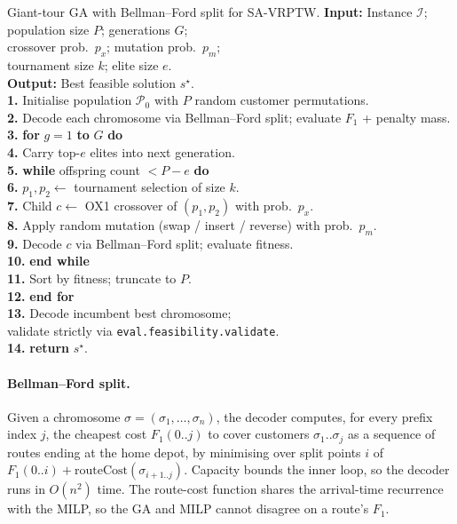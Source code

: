 \begin{pseudocode}{Giant-tour GA with Bellman--Ford split for SA-VRPTW.}
\label{alg:ga}
\textbf{Input:} \> Instance $\mathcal{I}$; population size $P$;
generations $G$; \\
\>\> crossover prob.\ $p_x$; mutation prob.\ $p_m$; \\
\>\> tournament size $k$; elite size $e$. \\
\textbf{Output:}\> Best feasible solution $s^\star$. \\[2pt]
\textbf{1.}\> Initialise population $\mathcal{P}_0$ with $P$ random
customer permutations. \\
\textbf{2.}\> Decode each chromosome via Bellman--Ford split; evaluate $F_1$ + penalty mass. \\
\textbf{3.}\> \textbf{for} $g = 1$ \textbf{to} $G$ \textbf{do} \\
\textbf{4.}\>\> Carry top-$e$ elites into next generation. \\
\textbf{5.}\>\> \textbf{while} offspring count $< P - e$ \textbf{do} \\
\textbf{6.}\>\>\> $p_1, p_2 \gets$ tournament selection of size $k$. \\
\textbf{7.}\>\>\> Child $c \gets$ OX1 crossover of $(p_1, p_2)$ with prob.\ $p_x$. \\
\textbf{8.}\>\>\> Apply random mutation (swap / insert / reverse) with prob.\ $p_m$. \\
\textbf{9.}\>\>\> Decode $c$ via Bellman--Ford split; evaluate fitness. \\
\textbf{10.}\>\> \textbf{end while} \\
\textbf{11.}\>\> Sort by fitness; truncate to $P$. \\
\textbf{12.}\> \textbf{end for} \\
\textbf{13.}\> Decode incumbent best chromosome; \\
\>\> validate strictly via \texttt{eval.feasibility.validate}. \\
\textbf{14.}\> \textbf{return} $s^\star$.
\end{pseudocode}

\paragraph{Bellman--Ford split.}
Given a chromosome $\sigma = (\sigma_1, \dots, \sigma_n)$, the
decoder computes, for every prefix index $j$, the cheapest cost
$F_1(0..j)$ to cover customers $\sigma_1..\sigma_j$ as a sequence of
routes ending at the home depot, by minimising over split points $i$
of $F_1(0..i) + \mathrm{routeCost}(\sigma_{i+1..j})$. Capacity bounds
the inner loop, so the decoder runs in $O(n^2)$ time. The route-cost
function shares the arrival-time recurrence with the MILP, so the GA
and MILP cannot disagree on a route's $F_1$.

